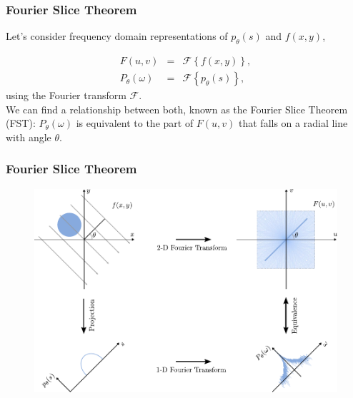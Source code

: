 \begin{frame}
	\frametitle{Fourier Slice Theorem}

	Let's consider frequency domain representations of $p_\theta(s)$ and $f(x, y)$,

	\begin{eqnarray}
		F(u,v) &=& \mathcal{F}\left\{f(x,y)\right\},\\
		P_{\theta}(\omega) &=& \mathcal{F}\left\{p_\theta(s)\right\},
	\end{eqnarray}
	using the Fourier transform $\mathcal{F}$.\\[1cm]

	We can find a relationship between both, known as the Fourier Slice Theorem (FST):
	$P_{\theta}(\omega)$ is equivalent to the part of $F(u,v)$ that falls on a radial line with angle $\theta$.
\end{frame}

\begin{frame}
	\frametitle{Fourier Slice Theorem}

	\begin{figure}[tbp]
		\centering
		\includegraphics[width=0.6\linewidth]{images/fourier_1}
		\label{fig:ct_fourier_1}
	\end{figure}

\end{frame}

